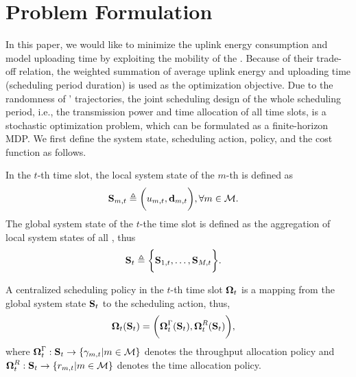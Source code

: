 \section{Problem Formulation}
\label{sec:formulation}
In this paper, we would like to minimize the uplink energy consumption and model uploading time by exploiting the mobility of the {\IAVs}.
Because of their trade-off relation, the weighted summation of average uplink energy and uploading time (scheduling period duration) is used as the optimization objective.
Due to the randomness of {\IAVs}' trajectories, the joint scheduling design of the whole scheduling period, i.e., the transmission power and time allocation of all time slots, is a stochastic optimization problem, which can be formulated as a finite-horizon MDP.
We first define the system state, scheduling action, policy, and the cost function as follows.

\begin{definition}
    \label{def:mdp}
    In the $t$-th time slot, the local system state of the $m$-th {\IAV} is defined as
    \begin{align}
        \mathbf{S}_{m,t} &\triangleq \bigg( u_{m,t}, \mathbf{d}_{m,t} \bigg), \forall m\in\mathcal{M}.
    \end{align}
    The global system state of the $t$-the time slot is defined as the aggregation of local system states of all {\IAVs}, thus
    \begin{align}
        \mathbf{S}_t &\triangleq \bigg\{ \mathbf{S}_{1,t}, \dots, \mathbf{S}_{M,t} \bigg\}.
    \end{align}

    A centralized scheduling policy in the $t$-th time slot $\boldsymbol{\Omega}_{t}$ is a mapping from the global system state $\mathbf{S}_{t}$ to the scheduling action, thus,
    \begin{align}
        \boldsymbol{\Omega}_{t}(\mathbf{S}_t) &= \bigg( \boldsymbol{\Omega}^{\Gamma}_{t}(\mathbf{S}_t), \boldsymbol{\Omega}^{R}_{t}(\mathbf{S}_t) \bigg),
    \end{align}
    where $\boldsymbol{\Omega}^{\Gamma}_{t}: \mathbf{S}_{t} \to \{\gamma_{m,t} | m\in\mathcal{M}\}$ denotes the throughput allocation policy and $\boldsymbol{\Omega}^{R}_{t}: \mathbf{S}_{t} \to \{r_{m,t} | m\in\mathcal{M}\}$ denotes the time allocation policy.
\end{definition}

